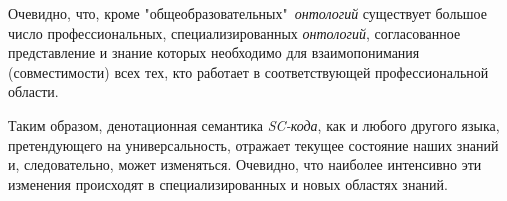 \begin{SCn}
{Очевидно, что, кроме "общеобразовательных"\ \textit{онтологий} существует большое число профессиональных, специализированных \textit{онтологий}, согласованное представление и знание которых необходимо для взаимопонимания (совместимости) всех тех, кто работает в соответствующей профессиональной области. 

Таким образом, денотационная семантика \textit{SC-кода}, как и любого другого языка, претендующего на универсальность, отражает текущее состояние наших знаний и, следовательно, может изменяться. Очевидно, что наиболее интенсивно эти изменения происходят в специализированных и новых областях знаний.
}

\end{SCn}